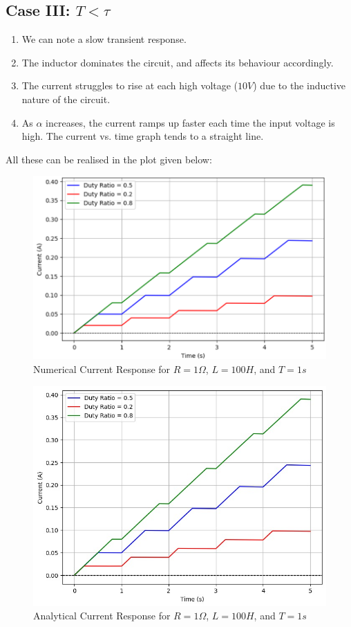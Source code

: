 \begin{multicols}{2}
\subsection{Case III: $T<\tau$}
\begin{enumerate}
    \item We can note a slow transient response.
    \item The inductor dominates the circuit, and affects its behaviour accordingly.
    \item The current struggles to rise at each high voltage ($10V$) due to the inductive nature of the circuit.
    \item As $\alpha$ increases, the current ramps up faster each time the input voltage is high. The current vs. time graph tends to a straight line.
\end{enumerate}
All these can be realised in the plot given below: \\
\begin{figure}[H]
  \centering
  \includegraphics[width=\columnwidth]{sections/6_case3.png}
  \caption{Numerical Current Response for $R=1\Omega$, $L=100H$, and $T=1s$}
\end{figure}
\begin{figure}[H]
  \centering
  \includegraphics[width=\columnwidth]{sections/case2a.png}
  \caption{Analytical Current Response for $R=1\Omega$, $L=100H$, and $T=1s$}
\end{figure}

\end{multicols}

